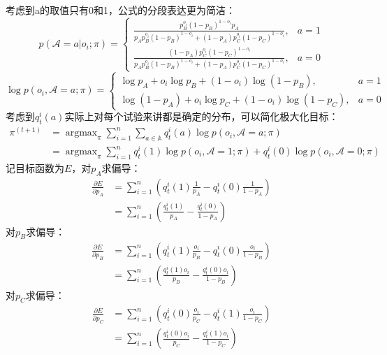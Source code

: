 \documentclass[12pt,a4paper]{article}
\DeclareMathOperator*{\argmax}{argmax}
\begin{document}
考虑到a的取值只有0和1，公式的分段表达更为简洁：
\begin{equation}
p(\mathcal{A}=a|o_i;\pi)=\begin{cases}
\frac{p_B^{o_i}(1-p_B)^{1-o_i}{p_A}}{p_Ap_B^{o_i}(1-p_B)^{1-o_i}+(1-p_A)p_C^{o_i}(1-p_C)^{1-o_i}}, & a=1\\
\frac{(1-p_A)p_C^{o_i}(1-p_C)^{1-o_i}}{p_Ap_B^{o_i}(1-p_B)^{1-o_i}+(1-p_A)p_C^{o_i}(1-p_C)^{1-o_i}}, & a=0
\end{cases}
\end{equation}
\begin{equation}
    \log p(o_i, \mathcal{A}=a;\pi)=\begin{cases}
    \log p_A + o_i\log p_B + (1-o_i)\log(1-p_B), & a=1\\
    \log(1-p_A) + o_i\log p_C + (1-o_i)\log(1-p_C), & a=0
    \end{cases}
\end{equation}
考虑到$q_t^i(a)$实际上对每个试验来讲都是确定的分布，可以简化极大化目标：
\begin{equation}
    \begin{split}
    \pi^{(t+1)} &= \argmax_{\pi}\sum_{i=1}^n  \sum_{a \in \mathbb{A}} q_t^i(a) \log p(o_i, \mathcal{A}=a;\pi)\\
    &=\argmax_{\pi}\sum_{i=1}^n  q_t^i(1) \log p(o_i, \mathcal{A}=1;\pi) + q_t^i(0) \log p(o_i, \mathcal{A}=0;\pi)
    \end{split}
\end{equation}
记目标函数为$E$，对$p_A$求偏导：
\begin{equation}
    \begin{split}
    \frac{\partial E}{\partial p_A} &= \sum_{i=1}^n \left(q_t^i(1) \frac{1}{p_A} - q_t^i(0) \frac{1}{1-p_A}\right)\\
    &=\sum_{i=1}^n \left(\frac{q_t^i(1)}{p_A} - \frac{q_t^i(0)}{1-p_A}\right)
    \end{split}
    \end{equation}
对$p_B$求偏导：
\begin{equation}
    \begin{split}
    \frac{\partial E}{\partial p_B} &= \sum_{i=1}^n \left(q_t^i(1) \frac{o_i}{p_B} - q_t^i(0) \frac{o_i}{1-p_B}\right)\\
    &=\sum_{i=1}^n \left(\frac{q_t^i(1)o_i}{p_B} - \frac{q_t^i(0)o_i}{1-p_B}\right)
    \end{split}
\end{equation}
对$p_C$求偏导：
\begin{equation}
    \begin{split}
    \frac{\partial E}{\partial p_C} &= \sum_{i=1}^n \left(q_t^i(0) \frac{o_i}{p_C} - q_t^i(1) \frac{o_i}{1-p_C}\right)\\
    &=\sum_{i=1}^n \left(\frac{q_t^i(0)o_i}{p_C} - \frac{q_t^i(1)o_i}{1-p_C}\right)
    \end{split}
\end{equation}
\end{document}
